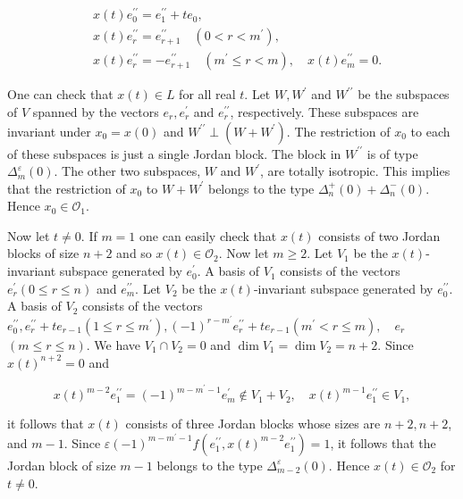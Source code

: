 \documentclass[10pt]{article}
\begin{document}
$$
\begin{aligned}
& x(t) e_{0}^{\prime \prime}=e_{1}^{\prime \prime}+t e_{0}, \\
& x(t) e_{r}^{\prime \prime}=e_{r+1}^{\prime \prime} \quad\left(0<r<m^{\prime}\right), \\
& x(t) e_{r}^{\prime \prime}=-e_{r+1}^{\prime \prime} \quad\left(m^{\prime} \leqslant r<m\right), \quad x(t) e_{m}^{\prime \prime}=0 .
\end{aligned}
$$

One can check that $x(t) \in L$ for all real $t$. Let $W, W^{\prime}$ and $W^{\prime \prime}$ be the subspaces of $V$ spanned by the vectors $e_{r}, e_{r}^{\prime}$ and $e_{r}^{\prime \prime}$, respectively. These subspaces are invariant under $x_{0}=x(0)$ and $W^{\prime \prime} \perp\left(W+W^{\prime}\right)$. The restriction of $x_{0}$ to each of these subspaces is just a single Jordan block. The block in $W^{\prime \prime}$ is of type $\Delta_{m}^{\varepsilon}(0)$. The other two subspaces, $W$ and $W^{\prime}$, are totally isotropic. This implies that the restriction of $x_{0}$ to $W+W^{\prime}$ belongs to the type $\Delta_{n}^{+}(0)+\Delta_{n}^{-}(0)$. Hence $x_{0} \in \mathcal{O}_{1}$.

Now let $t \neq 0$. If $m=1$ one can easily check that $x(t)$ consists of two Jordan blocks of size $n+2$ and so $x(t) \in \mathcal{O}_{2}$. Now let $m \geqslant 2$. Let $V_{1}$ be the $x(t)$-invariant subspace generated by $e_{0}^{\prime}$. A basis of $V_{1}$ consists of the vectors $e_{r}^{\prime}(0 \leqslant r \leqslant n)$ and $e_{m}^{\prime \prime}$. Let $V_{2}$ be the $x(t)$-invariant subspace generated by $e_{0}^{\prime \prime}$. A basis of $V_{2}$ consists of the vectors $e_{0}^{\prime \prime}, e_{r}^{\prime \prime}+t e_{r-1}\left(1 \leqslant r \leqslant m^{\prime}\right),(-1)^{r-m^{\prime}} e_{r}^{\prime \prime}+t e_{r-1}\left(m^{\prime}<r \leqslant m\right), \quad e_{r}$ $(m \leqslant r \leqslant n)$. We have $V_{1} \cap V_{2}=0$ and $\operatorname{dim} V_{1}=\operatorname{dim} V_{2}=n+2$. Since $x(t)^{n+2}=0$ and

$$
x(t)^{m-2} e_{1}^{\prime \prime}=(-1)^{m-m^{\prime}-1} e_{m}^{\prime} \notin V_{1}+V_{2}, \quad x(t)^{m-1} e_{1}^{\prime \prime} \in V_{1},
$$

it follows that $x(t)$ consists of three Jordan blocks whose sizes are $n+2, n+2$, and $m-1$. Since $\varepsilon(-1)^{m-m^{\prime}-1} f\left(e_{1}^{\prime \prime}, x(t)^{m-2} e_{1}^{\prime \prime}\right)=1$, it follows that the Jordan block of size $m-1$ belongs to the type $\Delta_{m-2}^{\varepsilon}(0)$. Hence $x(t) \in \mathcal{O}_{2}$ for $t \neq 0$.
\end{document}
